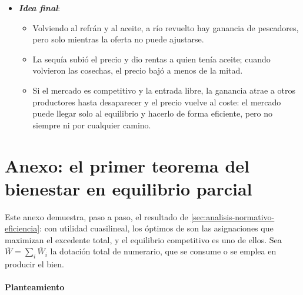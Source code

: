 \documentclass[11pt]{article}
\begin{document}
\begin{itemize}
\begin{itemize}
  \item Su debilidad es dinámica: describe el reposo final y no el proceso de competencia, como criticó \textcite{Hayek1948Meaning}\footnote{ recibió el Premio Nobel de Economía en 1974, con , «por su trabajo pionero en la teoría del dinero y de las fluctuaciones económicas y por su penetrante análisis de la interdependencia de los fenómenos económicos, sociales e institucionales»\nocite{Nobel1974}.} , y sin beneficios extraordinarios duraderos deja poco margen a la innovación de \textcite{Schumpeter1942Capitalism}.
  \end{itemize}
\item \textbf{\emph{Idea final}}:
  \begin{itemize}
  \item Volviendo al refrán y al aceite, a río revuelto hay ganancia de pescadores, pero solo mientras la oferta no puede ajustarse.

  \item La sequía subió el precio y dio rentas a quien tenía aceite; cuando volvieron las cosechas, el precio bajó a menos de la mitad.

  \item Si el mercado es competitivo y la entrada libre, la ganancia atrae a otros productores hasta desaparecer y el precio vuelve al coste: el mercado puede llegar solo al equilibrio y hacerlo de forma eficiente, pero no siempre ni por cualquier camino.
  \end{itemize}
\end{itemize}

\clearpage
\appendix

\section{Anexo: el primer teorema del bienestar\cortetitulo{} en equilibrio parcial}\label{anexo:1tfeb}

Este anexo demuestra, paso a paso, el resultado de \ref{sec:analisis-normativo-eficiencia}: con utilidad cuasilineal, los óptimos de  son las asignaciones que maximizan el excedente total, y el equilibrio competitivo es uno de ellos\nocite{MasColellWhinstonGreen1995}. Sea $\overline{W}=\sum_i\overline{W}_i$ la dotación total de numerario, que se consume o se emplea en producir el bien.

\paragraph{Planteamiento}
\end{document}
